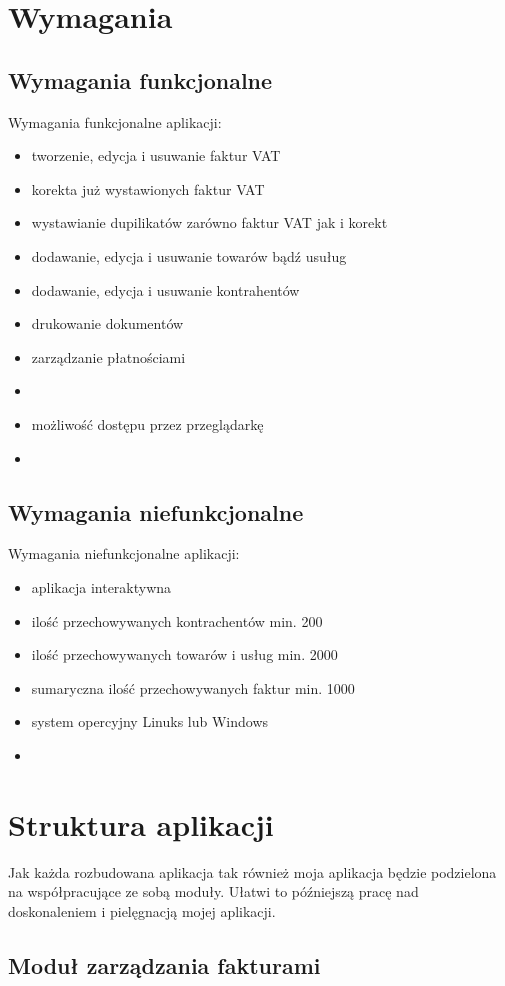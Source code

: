 \documentclass[12pt, a4paper]{article}
\begin{document}
\section{Wymagania}
\subsection{Wymagania funkcjonalne}
Wymagania funkcjonalne aplikacji:
\begin{itemize}
  \item tworzenie, edycja i usuwanie faktur VAT
  \item korekta już wystawionych faktur VAT
  \item wystawianie dupilikatów zarówno faktur VAT jak i korekt
  \item dodawanie, edycja i usuwanie towarów bądź usuług
  \item dodawanie, edycja i usuwanie kontrahentów
  \item drukowanie dokumentów
  \item zarządzanie płatnościami
  \item 
  \item możliwość dostępu przez przeglądarkę
  \item 
\end{itemize}
\subsection{Wymagania niefunkcjonalne}
Wymagania niefunkcjonalne aplikacji:
\begin{itemize}
  \item aplikacja interaktywna
  \item ilość przechowywanych kontrachentów min. 200
  \item ilość przechowywanych towarów i usług min. 2000
  \item sumaryczna ilość przechowywanych faktur min. 1000
  \item system opercyjny Linuks lub Windows
  \item 
\end{itemize}

\section{Struktura aplikacji}
Jak każda rozbudowana aplikacja tak również moja aplikacja będzie podzielona na
współpracujące ze sobą moduły. Ułatwi to późniejszą pracę nad doskonaleniem i
pielęgnacją mojej aplikacji.
\subsection{Moduł zarządzania fakturami}
\end{document}
